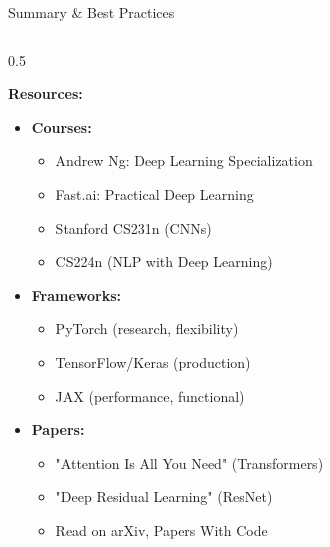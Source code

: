 \begin{frame}{Summary \& Best Practices}
\begin{columns}
\begin{column}{0.5\textwidth}
\vspace{0.3cm}

\textbf{Resources:}

\begin{itemize}
\item \textbf{Courses:}
  \begin{itemize}
  \item Andrew Ng: Deep Learning Specialization
  \item Fast.ai: Practical Deep Learning
  \item Stanford CS231n (CNNs)
  \item CS224n (NLP with Deep Learning)
  \end{itemize}

\item \textbf{Frameworks:}
  \begin{itemize}
  \item PyTorch (research, flexibility)
  \item TensorFlow/Keras (production)
  \item JAX (performance, functional)
  \end{itemize}

\item \textbf{Papers:}
  \begin{itemize}
  \item "Attention Is All You Need" (Transformers)
  \item "Deep Residual Learning" (ResNet)
  \item Read on arXiv, Papers With Code
  \end{itemize}
\end{itemize}
\end{column}
\end{columns}
\end{frame}



